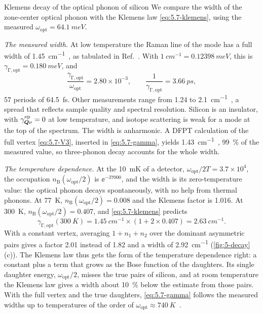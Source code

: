 \begin{workedexample}{Klemens decay of the optical phonon of silicon}\label{we:5-klemens}
We compare the width of the zone-center optical phonon with the Klemens law \cref{eq:5.7-klemens}, using the measured $\omega_{\mathrm{opt}} = \SI{64.1}{meV}$.

\emph{The measured width.} At low temperature the Raman line of the mode has a full width of \SI{1.45}{cm^{-1}}~\cite{menendez1984temperature}, as tabulated in Ref.~\cite[Table~1]{debernardi1994anharmonic}. With $\SI{1}{cm^{-1}} = \SI{0.12398}{meV}$, this is $\gamma_{\mathrm{\Gamma},\mathrm{opt}} = \SI{0.180}{meV}$, and
\begin{equation*}
  \frac{\gamma_{\mathrm{\Gamma},\mathrm{opt}}}{\omega_{\mathrm{opt}}} = 2.80\times10^{-3} , \qquad
  \frac{1}{\gamma_{\mathrm{\Gamma},\mathrm{opt}}} = \SI{3.66}{ps} ,
\end{equation*}
57 periods of \SI{64.5}{fs}. Other measurements range from 1.24 to \SI{2.1}{cm^{-1}}~\cite{debernardi1994anharmonic}, a spread that reflects sample quality and spectral resolution. Silicon is an insulator, with $\gamma^{\mathrm{ep}}_{\bm{Q}\nu} = 0$ at low temperature, and isotope scattering is weak for a mode at the top of the spectrum. The width is anharmonic. A DFPT calculation of the full vertex \cref{eq:5.7-V3}, inserted in \cref{eq:5.7-gamma}, yields \SI{1.43}{cm^{-1}}~\cite[Table~1]{debernardi1994anharmonic}, \SI{99}{\percent} of the measured value, so three-phonon decay accounts for the whole width.

\emph{The temperature dependence.} At the \SI{10}{mK} of a detector, $\omega_{\mathrm{opt}}/2T = 3.7\times10^4$, the occupation $n_{\mathrm{B}}(\omega_{\mathrm{opt}}/2)$ is $\ee^{-37000}$, and the width is its zero-temperature value: the optical phonon decays spontaneously, with no help from thermal phonons. At \SI{77}{K}, $n_{\mathrm{B}}(\omega_{\mathrm{opt}}/2) = 0.008$ and the Klemens factor is 1.016. At \SI{300}{K}, $n_{\mathrm{B}}(\omega_{\mathrm{opt}}/2) = 0.407$, and \cref{eq:5.7-klemens} predicts
\begin{equation*}
  \gamma_{\mathrm{\Gamma},\mathrm{opt}}(\SI{300}{K}) = \SI{1.45}{cm^{-1}}\times(1 + 2\times0.407) = \SI{2.63}{cm^{-1}} .
\end{equation*}
With a constant vertex, averaging $1 + n_1 + n_2$ over the dominant asymmetric pairs gives a factor 2.01 instead of 1.82 and a width of \SI{2.92}{cm^{-1}} (\cref{fig:5-decay}(c)). The Klemens law thus gets the form of the temperature dependence right: a constant plus a term that grows as the Bose function of the daughters. Its single daughter energy, $\omega_{\mathrm{opt}}/2$, misses the true pairs of silicon, and at room temperature the Klemens law gives a width about \SI{10}{\percent} below the estimate from those pairs. With the full vertex and the true daughters, \cref{eq:5.7-gamma} follows the measured widths up to temperatures of the order of $\omega_{\mathrm{opt}} \approx \SI{740}{K}$~\cite{debernardi1994anharmonic}.


\end{workedexample}
